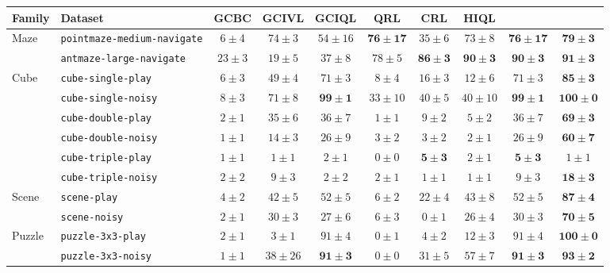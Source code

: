 \begin{tabular}{llcccccccc}
\toprule
Family & Dataset & GCBC & GCIVL & GCIQL & QRL & CRL & HIQL & \bestfixed{} & \wmpp{} \\
\midrule
\multirow{2}{*}{Maze} & \texttt{pointmaze-medium-navigate} & $6 \pm 4$ & $74 \pm 3$ & $54 \pm 16$ & $\mathbf{76 \pm 17}$ & $35 \pm 6$ & $73 \pm 8$ & $\mathbf{76 \pm 17}$ & $\mathbf{79 \pm 3}$ \\
 & \texttt{antmaze-large-navigate} & $23 \pm 3$ & $19 \pm 5$ & $37 \pm 8$ & $78 \pm 5$ & $\mathbf{86 \pm 3}$ & $\mathbf{90 \pm 3}$ & $\mathbf{90 \pm 3}$ & $\mathbf{91 \pm 3}$ \\
\midrule
\multirow{6}{*}{Cube} & \texttt{cube-single-play} & $6 \pm 3$ & $49 \pm 4$ & $71 \pm 3$ & $8 \pm 4$ & $16 \pm 3$ & $12 \pm 6$ & $71 \pm 3$ & $\mathbf{85 \pm 3}$ \\
 & \texttt{cube-single-noisy} & $8 \pm 3$ & $71 \pm 8$ & $\mathbf{99 \pm 1}$ & $33 \pm 10$ & $40 \pm 5$ & $40 \pm 10$ & $\mathbf{99 \pm 1}$ & $\mathbf{100 \pm 0}$ \\
 & \texttt{cube-double-play} & $2 \pm 1$ & $35 \pm 6$ & $36 \pm 7$ & $1 \pm 1$ & $9 \pm 2$ & $5 \pm 2$ & $36 \pm 7$ & $\mathbf{69 \pm 3}$ \\
 & \texttt{cube-double-noisy} & $1 \pm 1$ & $14 \pm 3$ & $26 \pm 9$ & $3 \pm 2$ & $3 \pm 2$ & $2 \pm 1$ & $26 \pm 9$ & $\mathbf{60 \pm 7}$ \\
 & \texttt{cube-triple-play} & $1 \pm 1$ & $1 \pm 1$ & $2 \pm 1$ & $0 \pm 0$ & $\mathbf{5 \pm 3}$ & $2 \pm 1$ & $\mathbf{5 \pm 3}$ & $1 \pm 1$ \\
 & \texttt{cube-triple-noisy} & $2 \pm 2$ & $9 \pm 3$ & $2 \pm 2$ & $2 \pm 1$ & $1 \pm 1$ & $1 \pm 1$ & $9 \pm 3$ & $\mathbf{18 \pm 3}$ \\
\midrule
\multirow{2}{*}{Scene} & \texttt{scene-play} & $4 \pm 2$ & $42 \pm 5$ & $52 \pm 5$ & $6 \pm 2$ & $22 \pm 4$ & $43 \pm 8$ & $52 \pm 5$ & $\mathbf{87 \pm 4}$ \\
 & \texttt{scene-noisy} & $2 \pm 1$ & $30 \pm 3$ & $27 \pm 6$ & $6 \pm 3$ & $0 \pm 1$ & $26 \pm 4$ & $30 \pm 3$ & $\mathbf{70 \pm 5}$ \\
\midrule
\multirow{8}{*}{Puzzle} & \texttt{puzzle-3x3-play} & $2 \pm 1$ & $3 \pm 1$ & $91 \pm 4$ & $0 \pm 1$ & $4 \pm 2$ & $12 \pm 3$ & $91 \pm 4$ & $\mathbf{100 \pm 0}$ \\
 & \texttt{puzzle-3x3-noisy} & $1 \pm 1$ & $38 \pm 26$ & $\mathbf{91 \pm 3}$ & $0 \pm 0$ & $31 \pm 5$ & $57 \pm 7$ & $\mathbf{91 \pm 3}$ & $\mathbf{93 \pm 2}$ \\

\end{tabular}
